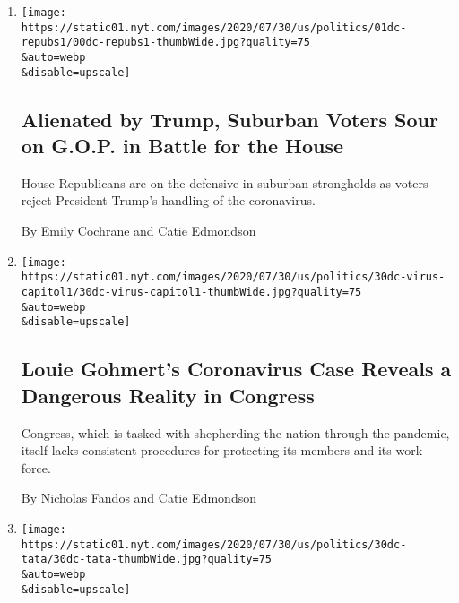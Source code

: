 \begin{enumerate}
\def\labelenumi{\arabic{enumi}.}
\item
  \href{/2020/08/01/us/politics/trump-suburban-voters-republicans-house.html}{}

  \texttt{[image: https://static01.nyt.com/images/2020/07/30/us/politics/01dc-repubs1/00dc-repubs1-thumbWide.jpg?quality=75\\\&auto=webp\\\&disable=upscale]}

  \hypertarget{alienated-by-trump-suburban-voters-sour-on-gop-in-battle-for-the-house}{%
  \subsection{Alienated by Trump, Suburban Voters Sour on G.O.P. in
  Battle for the
  House}\label{alienated-by-trump-suburban-voters-sour-on-gop-in-battle-for-the-house}}

  House Republicans are on the defensive in suburban strongholds as
  voters reject President Trump's handling of the coronavirus.

  By Emily Cochrane and Catie Edmondson
\item
  \href{/2020/07/30/us/politics/gohmert-coronavirus-congress.html}{}

  \texttt{[image: https://static01.nyt.com/images/2020/07/30/us/politics/30dc-virus-capitol1/30dc-virus-capitol1-thumbWide.jpg?quality=75\\\&auto=webp\\\&disable=upscale]}

  \hypertarget{louie-gohmerts-coronavirus-case-reveals-a-dangerous-reality-in-congress}{%
  \subsection{Louie Gohmert's Coronavirus Case Reveals a Dangerous
  Reality in
  Congress}\label{louie-gohmerts-coronavirus-case-reveals-a-dangerous-reality-in-congress}}

  Congress, which is tasked with shepherding the nation through the
  pandemic, itself lacks consistent procedures for protecting its
  members and its work force.

  By Nicholas Fandos and Catie Edmondson
\item
  \href{/2020/07/30/us/politics/trump-inhofe-tata-pentagon.html}{}

  \texttt{[image: https://static01.nyt.com/images/2020/07/30/us/politics/30dc-tata/30dc-tata-thumbWide.jpg?quality=75\\\&auto=webp\\\&disable=upscale]}

  \hypertarget{inflammatory-comments-delay-confirmation-of-retired-general-to-pentagon-post}{%
}
\end{enumerate}
